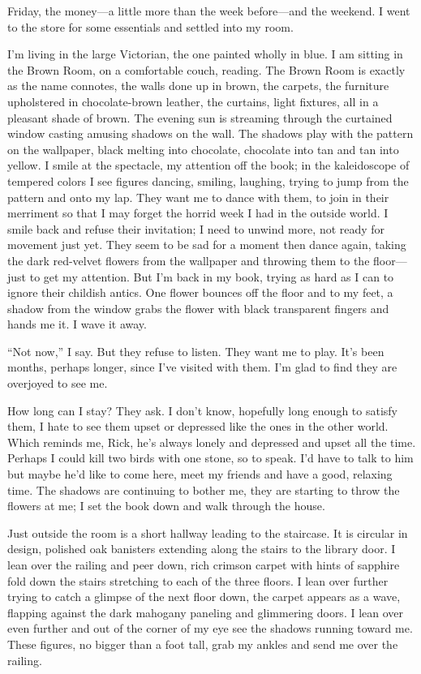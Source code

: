 \documentclass[
]{article}
\begin{document}
Friday, the money---a little more than the week before---and the
weekend. I went to the store for some essentials and settled into my
room.

I'm living in the large Victorian, the one painted wholly in blue. I am
sitting in the Brown Room, on a comfortable couch, reading. The Brown
Room is exactly as the name connotes, the walls done up in brown, the
carpets, the furniture upholstered in chocolate-brown leather, the
curtains, light fixtures, all in a pleasant shade of brown. The evening
sun is streaming through the curtained window casting amusing shadows on
the wall. The shadows play with the pattern on the wallpaper, black
melting into chocolate, chocolate into tan and tan into yellow. I smile
at the spectacle, my attention off the book; in the kaleidoscope of
tempered colors I see figures dancing, smiling, laughing, trying to jump
from the pattern and onto my lap. They want me to dance with them, to
join in their merriment so that I may forget the horrid week I had in
the outside world. I smile back and refuse their invitation; I need to
unwind more, not ready for movement just yet. They seem to be sad for a
moment then dance again, taking the dark red-velvet flowers from the
wallpaper and throwing them to the floor---just to get my attention. But
I'm back in my book, trying as hard as I can to ignore their childish
antics. One flower bounces off the floor and to my feet, a shadow from
the window grabs the flower with black transparent fingers and hands me
it. I wave it away.

``Not now,'' I say. But they refuse to listen. They want me to play.
It's been months, perhaps longer, since I've visited with them. I'm glad
to find they are overjoyed to see me.

How long can I stay? They ask. I don't know, hopefully long enough to
satisfy them, I hate to see them upset or depressed like the ones in the
other world. Which reminds me, Rick, he's always lonely and depressed
and upset all the time. Perhaps I could kill two birds with one stone,
so to speak. I'd have to talk to him but maybe he'd like to come here,
meet my friends and have a good, relaxing time. The shadows are
continuing to bother me, they are starting to throw the flowers at me; I
set the book down and walk through the house.

Just outside the room is a short hallway leading to the staircase. It is
circular in design, polished oak banisters extending along the stairs to
the library door. I lean over the railing and peer down, rich crimson
carpet with hints of sapphire fold down the stairs stretching to each of
the three floors. I lean over further trying to catch a glimpse of the
next floor down, the carpet appears as a wave, flapping against the dark
mahogany paneling and glimmering doors. I lean over even further and out
of the corner of my eye see the shadows running toward me. These
figures, no bigger than a foot tall, grab my ankles and send me over the
railing.
\end{document}
